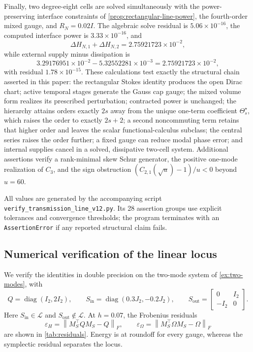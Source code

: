 \documentclass[11pt,a4paper]{article}
\newcommand{\cL}{\mathcal L}
\newcommand{\norm}[1]{\left\lVert #1\right\rVert}
\newcommand{\diag}{\operatorname{diag}}
\begin{document}
Finally, two degree-eight cells are solved simultaneously with the
power-preserving interface constraints of
\cref{prop:rectangular-line-power}, the fourth-order mixed gauge, and
\(R_N=0.02I\).  The algebraic solve residual is
\(5.06\times10^{-16}\), the computed interface power is
\(3.33\times10^{-16}\), and
\[
 \Delta H_{N,1}+\Delta H_{N,2}
 =2.75921723\times10^{-2},
\]
while external supply minus dissipation is
\[
 3.29176951\times10^{-2}-5.32552281\times10^{-3}
 =2.75921723\times10^{-2},
\]
with residual \(1.78\times10^{-15}\).  These calculations test exactly
the structural chain asserted in this paper: the rectangular Stokes
identity produces the open Dirac chart; active temporal stages generate
the Gauss cap gauge; the mixed volume form realizes its prescribed
perturbation; contracted power is unchanged; the hierarchy attains orders
exactly \(2s\) away from the unique one-term coefficient
\(\Theta_s^\star\), which raises the order to exactly \(2s+2\); a second
noncommuting term retains that higher order and leaves the scalar
functional-calculus subclass; the central series raises the order further;
a fixed gauge can reduce
modal phase error; and internal supplies cancel in a solved, dissipative
two-cell system.  Additional assertions verify a rank-minimal skew Schur
generator, the positive one-mode realization of \(C_3\), and the sign
obstruction \((C_{2,1}(\sqrt u)-1)/u<0\) beyond \(u=60\).

All values are generated by the accompanying script
\texttt{verify\_transmission\_line\_v12.py}.  Its 28 assertion groups use
explicit tolerances and convergence thresholds; the program terminates
with an \texttt{AssertionError} if any reported structural claim fails.

\subsection{Numerical verification of the linear locus}

We verify the identities in double precision on the two-mode system of
\cref{ex:two-modes}, with
\[
 Q=\diag(I_2,2I_2),\qquad
 S_{\mathrm{in}}=\diag(0.3J_2,-0.2J_2),\qquad
 S_{\mathrm{out}}=
 \begin{bmatrix}0&I_2\\-I_2&0\end{bmatrix}.
\]
Here \(S_{\mathrm{in}}\in\cL\) and
\(S_{\mathrm{out}}\notin\cL\). At \(h=0.07\), the Frobenius residuals
\[
 \varepsilon_H=\norm{M_S^\top QM_S-Q}_F,\qquad
 \varepsilon_\Omega=\norm{M_S^\top\Omega M_S-\Omega}_F
\]
are shown in \cref{tab:residuals}. Energy is at roundoff for every gauge,
whereas the symplectic residual separates the locus.
\end{document}
